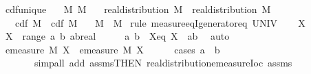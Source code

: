 \documentclass{article}
\theoremstyle{definition}
\begin{document}
\begin{isabellebody}
\isamarkupfalse%
\ cdf{\isacharunderscore}unique{\isacharcolon}\isanewline
\ \ \ M{}\ M{}\isanewline
\ \ \ {\isachardoublequoteopen}real{\isacharunderscore}distribution\ M{}{\isachardoublequoteclose}\ \ {\isachardoublequoteopen}real{\isacharunderscore}distribution\ M{}{\isachardoublequoteclose}\isanewline
\ \ \ {\isachardoublequoteopen}cdf\ M{}\ {\isacharequal}\ cdf\ M{}{\isachardoublequoteclose}\isanewline
\ \ \ {\isachardoublequoteopen}M{}\ {\isacharequal}\ M{}{\isachardoublequoteclose}\isanewline
{}\isamarkupfalse%
\ {\isacharparenleft}rule\ measure{\isacharunderscore}eqI{\isacharunderscore}generator{\isacharunderscore}eq{\isacharbrackleft}\ {\isasymOmega}{\isacharequal}UNIV{\isacharbrackright}{\isacharparenright}\isanewline
\ \ \isamarkupfalse%
\ X\ \isamarkupfalse%
\ {\isachardoublequoteopen}X\ {\isasymin}\ range\ {\isacharparenleft}{\isasymlambda}{\isacharparenleft}a{\isacharcomma}\ b{\isacharparenright}{\isachardot}\ {\isacharbraceleft}a{\isacharless}{\isachardot}{\isachardot}b{\isacharcolon}{\isacharcolon}real{\isacharbraceright}{\isacharparenright}{\isachardoublequoteclose}\isanewline
\ \ \isamarkupfalse%
\ \isamarkupfalse%
\ a\ b\ \ Xeq{\isacharcolon}\ {\isachardoublequoteopen}X\ {\isacharequal}\ {\isacharbraceleft}a{\isacharless}{\isachardot}{\isachardot}b{\isacharbraceright}{\isachardoublequoteclose}\ \isamarkupfalse%
\ auto\isanewline
\ \ \isamarkupfalse%
\ \isamarkupfalse%
\ {\isachardoublequoteopen}emeasure\ M{}\ X\ {\isacharequal}\ emeasure\ M{}\ X{\isachardoublequoteclose}\isanewline
\ \ \ \ \isamarkupfalse%
\ {\isacharparenleft}cases\ {\isachardoublequoteopen}a\ {\isasymle}\ b{\isachardoublequoteclose}{\isacharparenright}\isanewline
\ \ \ \ \ \ \ {\isacharparenleft}simp{\isacharunderscore}all\ add{\isacharcolon}\ assms{\isacharparenleft}{}{\isacharcomma}{}{\isacharparenright}{\isacharbrackleft}THEN\ real{\isacharunderscore}distribution{\isachardot}emeasure{\isacharunderscore}Ioc{\isacharbrackright}\ assms{\isacharparenleft}{}{\isacharparenright}{\isacharparenright}\isanewline
{}\isamarkupfalse%
\isanewline
\ \ \isamarkupfalse%

\end{isabellebody}
\end{document}
